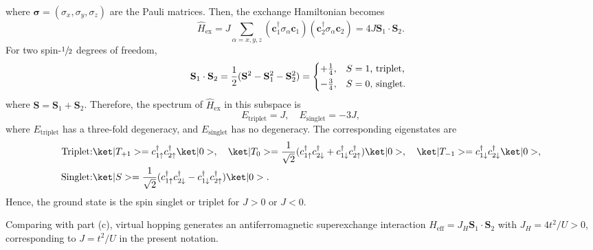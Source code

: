 \begin{solution}
\begin{enumext}
\[    \]
    where $\bm{\sigma} = (\sigma_x,\sigma_y,\sigma_z)$ are the Pauli matrices.
    Then, the exchange Hamiltonian becomes
    \[
      \hat H_\text{ex} = J \sum_{\alpha=x,y,z}
      (\bm c_1^\dagger \sigma_\alpha \bm c_1)
      (\bm c_2^\dagger \sigma_\alpha \bm c_2)
    = 4J \mathbf S_1 \cdot \mathbf S_2.
    \]
    For two spin-$\sfrac12$ degrees of freedom,
    \[
      \mathbf S_1 \cdot \mathbf S_2
    = \frac12(\mathbf S^2 - \mathbf S_1^2 - \mathbf S_2^2)
    = \begin{cases*}
      +\frac14, & $S = 1$, triplet,\\
      -\frac34, & $S = 0$, singlet.
      \end{cases*}
    \]
    where $\mathbf S = \mathbf S_1 + \mathbf S_2$.
    Therefore, the spectrum of $\hat H_\text{ex}$ in this subspace is
    \[
      E_\text{triplet} = J, \quad
      E_\text{singlet} = -3J,
    \]
    where $E_\text{triplet}$ has a three-fold degeneracy, and $E_\text{singlet}$
    has no degeneracy.
    The corresponding eigenstates are
    \begin{align*}
    \text{Triplet:}
    & \ket|T_{+1}> = c_{1\uparrow}^\dagger c_{2\uparrow}^\dagger\ket|0>, \quad
      \ket|T_0> = \frac{1}{\sqrt2}
      (c_{1\uparrow}^\dagger c_{2\downarrow}^\dagger
     + c_{1\downarrow}^\dagger c_{2\uparrow}^\dagger)\ket|0>, \quad
      \ket|T_{-1}> = c_{1\downarrow}^\dagger c_{2\downarrow}^\dagger\ket|0>,\\
    \text{Singlet:}
    & \ket|S> = \frac{1}{\sqrt2}
      (c_{1\uparrow}^\dagger c_{2\downarrow}^\dagger
     - c_{1\downarrow}^\dagger c_{2\uparrow}^\dagger)\ket|0>.
    \end{align*}
    Hence, the ground state is the spin singlet or triplet
    for $J > 0$ or $J < 0$.
    
    Comparing with part (c), virtual hopping generates an antiferromagnetic
    superexchange interaction
    $H_{\text{eff}} = J_H \mathbf S_1 \cdot \mathbf S_2$ with $J_H = 4t^2/U>0$,
    corresponding to $J = t^2/U$ in the present notation.
  \end{enumext}
\end{solution}